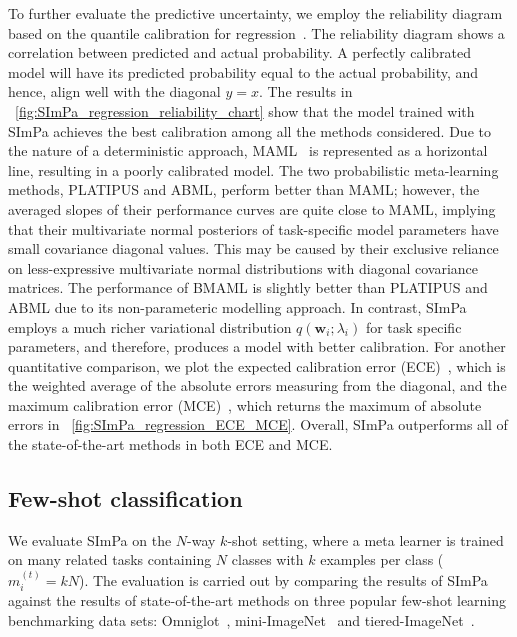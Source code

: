         To further evaluate the predictive uncertainty, we employ the reliability diagram based on the quantile calibration for regression~\cite{song19distribution}. The reliability diagram shows a correlation between predicted and actual probability. A perfectly calibrated model will have its predicted probability equal to the actual probability, and hence, align well with the diagonal \(y = x\). The results in \figureautorefname~\ref{fig:SImPa_regression_reliability_chart} show that the model trained with SImPa achieves the best calibration among all the methods considered. Due to the nature of a deterministic approach, MAML~\cite{finn2017model} is represented as a horizontal line, resulting in a poorly calibrated model. The two probabilistic meta-learning methods, PLATIPUS and ABML, perform better than MAML; however, the averaged slopes of their performance curves are quite close to MAML, implying that their multivariate normal posteriors of task-specific model parameters have small covariance diagonal values. This may be caused by their exclusive reliance on less-expressive multivariate normal distributions with diagonal covariance matrices. The performance of BMAML is slightly better than PLATIPUS and ABML due to its non-parameteric modelling approach. In contrast, SImPa employs a much richer variational distribution \(q(\mathbf{w}_{i}; \lambda_{i})\) for task specific parameters, and therefore, produces a model with better calibration. For another quantitative comparison, we plot the expected calibration error (ECE)~\cite{guo2017oncalibration}, which is the weighted average of the absolute errors measuring from the diagonal, and the maximum calibration error (MCE)~\cite{guo2017oncalibration}, which returns the maximum of absolute errors in \figureautorefname~\ref{fig:SImPa_regression_ECE_MCE}. Overall, SImPa outperforms all of the state-of-the-art methods in both ECE and MCE.
        
    \subsection{Few-shot classification}
    \label{sec:classification}
        We evaluate SImPa on the \(N\)-way \(k\)-shot setting, where a meta learner is trained on many related tasks containing \(N\) classes with \(k\) examples per class (\({m_{i}^{(t)} = kN}\)). The evaluation is carried out by comparing the results of SImPa against the results of state-of-the-art methods on three popular few-shot learning benchmarking data sets: Omniglot~\cite{lake2015human}, mini-ImageNet~\cite{vinyals2016matching,ravi2017optimization} and tiered-ImageNet~\cite{ren2018meta}.
	    
